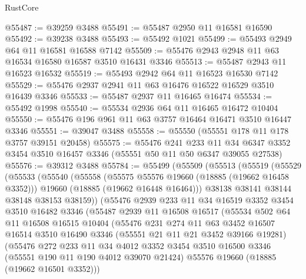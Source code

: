\begin{lexlean}{RustCore}
\begin{coremodule}
@55487 := @39259 @3488
@55491 := @55487 @2950 @11 @16581 @16590
@55492 := @39238 @3488
@55493 := @55492 @1021
@55499 := @55493 @2949 @64 @11 @16581 @16588 @7142
@55509 := @55476 @2943 @2948 @11 @63 @16534 @16580 @16587 @3510 @16431 @3346
@55513 := @55487 @2943 @11 @16523 @16532
@55519 := @55493 @2942 @64 @11 @16523 @16530 @7142
@55529 := @55476 @2937 @2941 @11 @63 @16476 @16522 @16529 @3510 @16439 @3346
@55533 := @55487 @2937 @11 @16465 @16474
@55534 := @55492 @1998
@55540 := @55534 @2936 @64 @11 @16465 @16472 @10404
@55550 := @55476 @196 @961 @11 @63 @3757 @16464 @16471 @3510 @16447 @3346
@55551 := @39047 @3488
@55558 := @55550 (@55551 @178 @11 @178 @3757 @39151 @20458)
@55575 := @55476
    @241
    @233
    @11
    @34
    @6347
    @3352
    @3454
    @3510
    @16457
    @3346
    (@55551 @50 @11 @50 @6347 @39055 @27538)
@55576 := @39312 @3488
@55784 := @55499
    (@55509
      (@55513
        (@55519
          (@55529
            (@55533
              (@55540
                (@55558
                  (@55575 @55576 @19660 (@18885 (@19662 @16458 @3352)))
                  @19660
                  (@18885 (@19662 @16448 @16464)))
                @38138
                @38141
                @38144
                @38148
                @38153
                @38159))
            (@55476
              @2939
              @233
              @11
              @34
              @16519
              @3352
              @3454
              @3510
              @16482
              @3346
              (@55487
                @2939
                @11
                @16508
                @16517
                (@55534
                  @502
                  @64
                  @11
                  @16508
                  @16515
                  @10404
                  (@55476
                    @231
                    @274
                    @11
                    @63
                    @3452
                    @16507
                    @16514
                    @3510
                    @16490
                    @3346
                    (@55551 @21 @11 @21 @3452 @39166 @19281)
                    (@55476
                      @272
                      @233
                      @11
                      @34
                      @4012
                      @3352
                      @3454
                      @3510
                      @16500
                      @3346
                      (@55551 @190 @11 @190 @4012 @39070 @21424)
                      @55576
                      @19660
                      (@18885 (@19662 @16501 @3352)))

\end{coremodule}
\end{lexlean}
